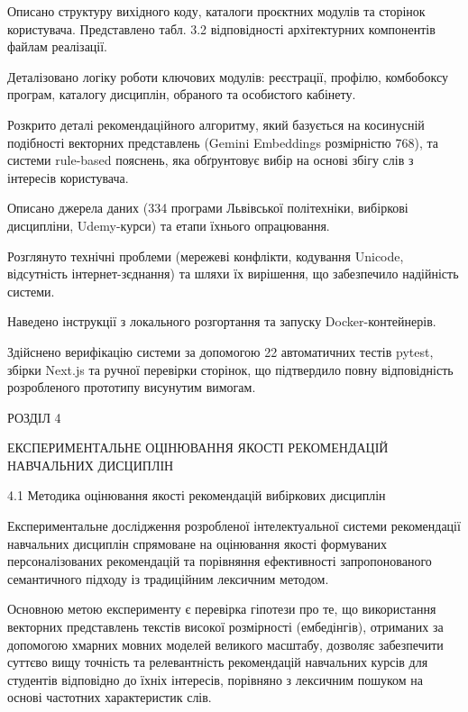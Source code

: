 \documentclass[
]{article}
\begin{document}
Описано структуру вихідного коду, каталоги проєктних модулів та сторінок
користувача. Представлено табл. 3.2 відповідності архітектурних
компонентів файлам реалізації.

Деталізовано логіку роботи ключових модулів: реєстрації, профілю,
комбобоксу програм, каталогу дисциплін, обраного та особистого кабінету.

Розкрито деталі рекомендаційного алгоритму, який базується на косинусній
подібності векторних представлень (Gemini Embeddings розмірністю 768),
та системи rule-based пояснень, яка обґрунтовує вибір на основі збігу
слів з інтересів користувача.

Описано джерела даних (334 програми Львівської політехніки, вибіркові
дисципліни, Udemy-курси) та етапи їхнього опрацювання.

Розглянуто технічні проблеми (мережеві конфлікти, кодування Unicode,
відсутність інтернет-з\textquotesingle єднання) та шляхи їх вирішення,
що забезпечило надійність системи.

Наведено інструкції з локального розгортання та запуску
Docker-контейнерів.

Здійснено верифікацію системи за допомогою 22 автоматичних тестів
pytest, збірки Next.js та ручної перевірки сторінок, що підтвердило
повну відповідність розробленого прототипу висунутим вимогам.

\protect{}\label{X18419dff7653a7b63522449b206c8f6305e1af3}{}РОЗДІЛ
4

\protect{}\label{_Toc230434105}{}ЕКСПЕРИМЕНТАЛЬНЕ
ОЦІНЮВАННЯ ЯКОСТІ РЕКОМЕНДАЦІЙ НАВЧАЛЬНИХ ДИСЦИПЛІН

\protect{}\label{Xf97a46f423aba4c2be3ead83d121b35af23a104}{}4.1
Методика оцінювання якості рекомендацій вибіркових дисциплін

Експериментальне дослідження розробленої інтелектуальної системи
рекомендації навчальних дисциплін спрямоване на оцінювання якості
формуваних персоналізованих рекомендацій та порівняння ефективності
запропонованого семантичного підходу із традиційним лексичним методом.

Основною метою експерименту є перевірка гіпотези про те, що використання
векторних представлень текстів високої розмірності (ембедінгів),
отриманих за допомогою хмарних мовних моделей великого масштабу,
дозволяє забезпечити суттєво вищу точність та релевантність рекомендацій
навчальних курсів для студентів відповідно до їхніх інтересів, порівняно
з лексичним пошуком на основі частотних характеристик слів.
\end{document}
